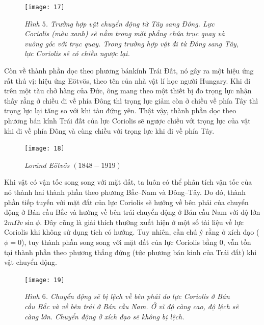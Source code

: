 \begin{multicols}{2}
			\begin{figure}[H]
		\vspace*{-5pt}
		\centering
		\captionsetup{labelformat= empty, justification=centering}
		\texttt{[image: 17]}
		\caption{\small\textit{\color{timhieukhoahoc}Hình $5$. Trường hợp vật chuyển động từ Tây sang Đông. Lực Coriolis (màu xanh) sẽ nằm trong mặt phẳng chứa trục quay và vuông góc với trục quay. Trong trường hợp vật đi từ Đông sang Tây, lực Coriolis sẽ có chiều ngược lại.}}
		\vspace*{-10pt}
	\end{figure}
	Còn về thành phần dọc theo phương bán\linebreak kính Trái Đất, nó gây ra một hiệu ứng rất thú vị: hiệu ứng Eötvös, theo tên của nhà vật lí học người Hungary. Khi đi trên một tàu chở hàng của Đức, ông mang theo một thiết bị đo trọng lực nhận thấy rằng ở chiều đi về phía Đông thì trọng lực giảm còn ở chiều về phía Tây thì trọng lực lại tăng so với khi tàu đứng yên. Thật vậy, thành phần dọc theo phương bán kính Trái đất của lực Coriolis sẽ ngược chiều với trọng lực của vật khi đi về phía Đông và cùng chiều với trọng lực khi đi về phía Tây.
	\begin{figure}[H]
		\vspace*{-5pt}
		\centering
		\captionsetup{labelformat= empty, justification=centering}
		\texttt{[image: 18]}
		\caption{\small\textit{\color{timhieukhoahoc}Loránd Eötvös $(1848-1919)$}}
		\vspace*{-5pt}
	\end{figure}
	Khi vật có vận tốc song song với mặt đất, ta luôn có thể phân tích vận tốc của nó thành hai thành phần theo phương Bắc--Nam và Đông--Tây. Do đó, thành phần tiếp tuyến với mặt đất của lực Coriolis sẽ hướng về bên phải của chuyển động ở Bán cầu Bắc và hướng về bên trái chuyển động ở Bán cầu Nam với độ lớn $2m\Omega v\sin\phi$. Đây cũng là giải thích thường xuất hiện ở một số tài liệu về lực Coriolis khi không sử dụng tích có hướng. Tuy nhiên, cần chú ý rằng ở xích đạo ($\phi=0$), tuy thành phần song song với mặt đất của lực Coriolis bằng $0$, vẫn tồn tại thành phần theo phương thẳng đứng (tức phương bán kinh của Trái đất) khi vật chuyển động.
	\begin{figure}[H]
		\vspace*{-5pt}
		\centering
		\captionsetup{labelformat= empty, justification=centering}
		\texttt{[image: 19]}
		\caption{\small\textit{\color{timhieukhoahoc}Hình $6$. Chuyển động sẽ bị lệch về bên phải do lực Coriolis ở Bán cầu Bắc và về bên trái ở Bán cầu Nam. Ở vĩ độ càng cao, độ lệch sẽ càng lớn. Chuyển động ở xích đạo sẽ không bị lệch.}}

\end{figure}
\end{multicols}
